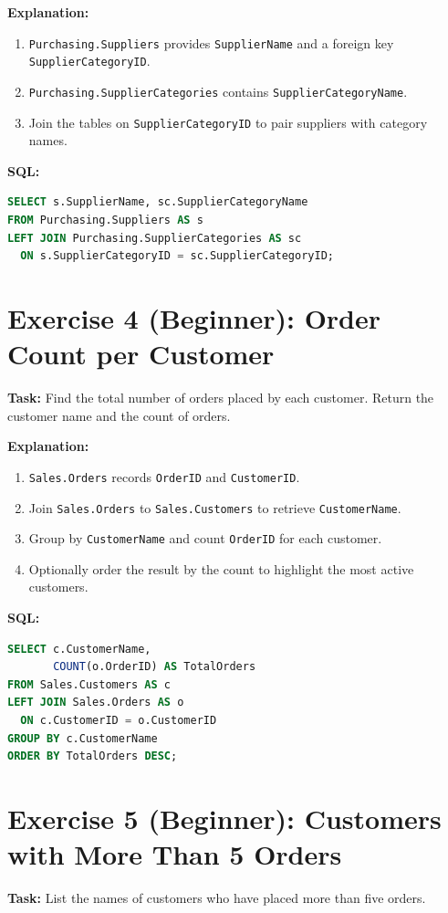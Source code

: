\documentclass[12pt,a4paper]{article}
\begin{document}
\textbf{Explanation:}
\begin{enumerate}
  \item \texttt{Purchasing.Suppliers} provides \texttt{SupplierName} and a foreign key \texttt{SupplierCategoryID}.
  \item \texttt{Purchasing.SupplierCategories} contains \texttt{SupplierCategoryName}.
  \item Join the tables on \texttt{SupplierCategoryID} to pair suppliers with category names.
\end{enumerate}

\textbf{SQL:}
\begin{lstlisting}[language=SQL]
SELECT s.SupplierName, sc.SupplierCategoryName
FROM Purchasing.Suppliers AS s
LEFT JOIN Purchasing.SupplierCategories AS sc
  ON s.SupplierCategoryID = sc.SupplierCategoryID;
\end{lstlisting}

\section{Exercise 4 (Beginner): Order Count per Customer}
\textbf{Task:} Find the total number of orders placed by each customer. Return the customer name and the count of orders.

\textbf{Explanation:}
\begin{enumerate}
  \item \texttt{Sales.Orders} records \texttt{OrderID} and \texttt{CustomerID}.
  \item Join \texttt{Sales.Orders} to \texttt{Sales.Customers} to retrieve \texttt{CustomerName}.
  \item Group by \texttt{CustomerName} and count \texttt{OrderID} for each customer.
  \item Optionally order the result by the count to highlight the most active customers.
\end{enumerate}

\textbf{SQL:}
\begin{lstlisting}[language=SQL]
SELECT c.CustomerName,
       COUNT(o.OrderID) AS TotalOrders
FROM Sales.Customers AS c
LEFT JOIN Sales.Orders AS o
  ON c.CustomerID = o.CustomerID
GROUP BY c.CustomerName
ORDER BY TotalOrders DESC;
\end{lstlisting}

\section{Exercise 5 (Beginner): Customers with More Than 5 Orders}
\textbf{Task:} List the names of customers who have placed more than five orders.
\end{document}
